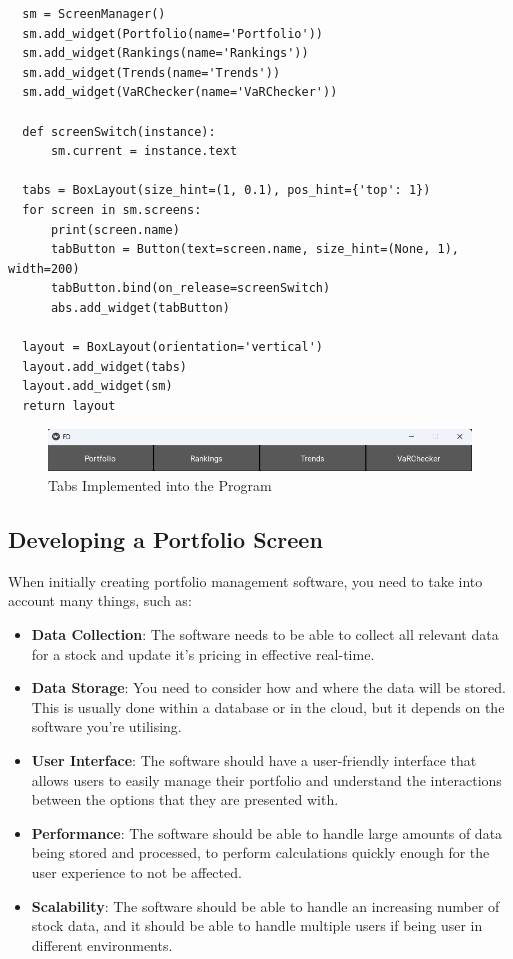 \documentclass{article}
\begin{document}
\begin{verbatim}
  sm = ScreenManager()        
  sm.add_widget(Portfolio(name='Portfolio'))
  sm.add_widget(Rankings(name='Rankings'))
  sm.add_widget(Trends(name='Trends'))
  sm.add_widget(VaRChecker(name='VaRChecker'))

  def screenSwitch(instance):
      sm.current = instance.text

  tabs = BoxLayout(size_hint=(1, 0.1), pos_hint={'top': 1})
  for screen in sm.screens:
      print(screen.name)
      tabButton = Button(text=screen.name, size_hint=(None, 1), width=200)
      tabButton.bind(on_release=screenSwitch)
      abs.add_widget(tabButton)

  layout = BoxLayout(orientation='vertical')
  layout.add_widget(tabs)
  layout.add_widget(sm)
  return layout
\end{verbatim}

\begin{figure}[h]
  \centering
  \includegraphics[width=1\textwidth]{Images/Term 2 Images/tabs.png}
  \caption{Tabs Implemented into the Program}
  \label{fig:Tabs}
\end{figure}


\subsection{Developing a Portfolio Screen}
When initially creating portfolio management software, you need to take into account many things, such as:
\begin{itemize}
  \item \textbf{Data Collection}: The software needs to be able to collect all relevant data for a stock and update it's pricing in effective real-time.
  \item \textbf{Data Storage}: You need to consider how and where the data will be stored. This is usually done within a database or in the cloud, but it depends on the software you're utilising.
  \item \textbf{User Interface}: The software should have a user-friendly interface that allows users to easily manage their portfolio and understand the interactions between the options that they are presented with.
  \item \textbf{Performance}: The software should be able to handle large amounts of data being stored and processed, to perform calculations quickly enough for the user experience to not be affected.
  \item \textbf{Scalability}: The software should be able to handle an increasing number of stock data, and it should be able to handle multiple users if being user in different environments.
\end{itemize}
\end{document}
